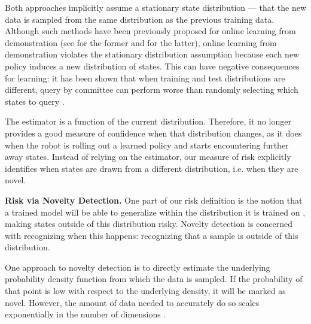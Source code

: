 \documentclass[10pt, conference]{ieeeconf}      %
\begin{document}
Both approaches implicitly assume a stationary state distribution --- that the new data is sampled from the same distribution as the previous training data. Although such methods have been previously proposed for online learning from demonstration (see \cite{chernova2009interactive,grollman2007dogged} for the former and \cite{judah2011active,judah2012active} for the latter),
online learning from demonstration violates the stationary distribution assumption because each new policy induces a new distribution of states. This can have negative consequences for learning: it has been shown that when training and test distributions are different, query by committee can perform worse than randomly selecting  which states to query \cite{burbidge2007active}.

The  estimator is a function of the current distribution. Therefore, it no longer provides a good measure of confidence when that distribution changes, as it does when the robot is rolling out a learned policy and starts encountering further away states. Instead of relying on the estimator, our measure of risk explicitly identifies when states are drawn from a different distribution, i.e. when they are novel. 





\noindent\textbf{Risk via Novelty Detection.}
One part of our risk definition is the notion that a trained model will be able to generalize within the distribution it is
trained on \cite{tokdar2010importance}, making states outside of this distribution risky. Novelty detection \cite{hodge2004survey} is concerned with recognizing when this happens: recognizing that a sample is outside of this distribution.

One approach to novelty detection is to directly estimate the underlying probability density function from which the data is sampled. If the probability of that point is low with respect to the underlying density, it will be marked as novel. However, the amount of data needed to accurately do so scales exponentially in the number of dimensions \cite{nadaraya1964estimating}.
\end{document}
